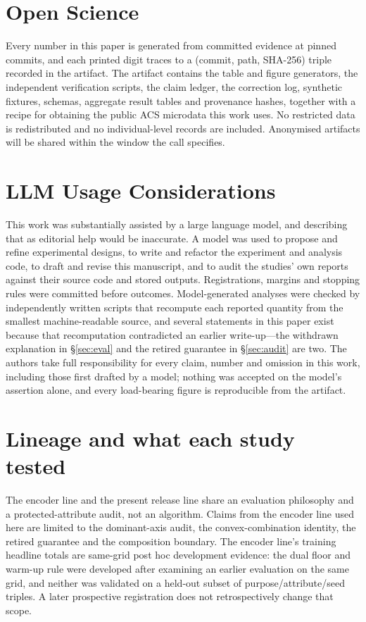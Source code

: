 \documentclass[conference]{IEEEtran}
\begin{document}
\section*{Open Science}
Every number in this paper is generated from committed evidence at pinned commits, and each printed digit
traces to a (commit, path, SHA-256) triple recorded in the artifact. The artifact contains the table and
figure generators, the independent verification scripts, the claim ledger, the correction log, synthetic
fixtures, schemas, aggregate result tables and provenance hashes, together with a recipe for obtaining the
public ACS microdata this work uses. No restricted data is redistributed and no individual-level records
are included. Anonymised artifacts will be shared within the window the call specifies.

\section*{LLM Usage Considerations}
This work was substantially assisted by a large language model, and describing that as editorial help would
be inaccurate. A model was used to propose and refine experimental designs, to write and refactor the
experiment and analysis code, to draft and revise this manuscript, and to audit the studies' own reports
against their source code and stored outputs. Registrations, margins and stopping rules were committed
before outcomes. Model-generated analyses were checked by independently written scripts that recompute each
reported quantity from the smallest machine-readable source, and several statements in this paper exist
because that recomputation contradicted an earlier write-up---the withdrawn explanation in
\S\ref{sec:eval} and the retired guarantee in \S\ref{sec:audit} are two. The authors take full
responsibility for every claim, number and omission in this work, including those first drafted by a model;
nothing was accepted on the model's assertion alone, and every load-bearing figure is reproducible from the
artifact.




\appendices

\section{Lineage and what each study tested}
\label{app:lineage}
The encoder line and the present release line share an evaluation philosophy and a protected-attribute
audit, not an algorithm. Claims from the encoder line used here are limited to the dominant-axis audit, the
convex-combination identity, the retired guarantee and the composition boundary. The encoder line's
training headline totals are same-grid post hoc development evidence: the dual floor and warm-up rule were
developed after examining an earlier evaluation on the same grid, and neither was validated on a held-out
subset of purpose/attribute/seed triples. A later prospective registration does not retrospectively change
that scope.
\end{document}
